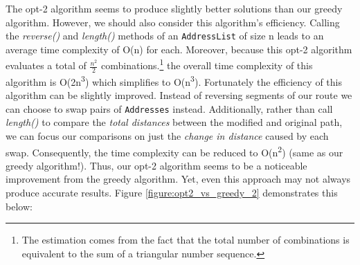 \documentclass[letterpaper]{article}
\begin{document}
\begin{figure}[h]
\begin{minipage}{0.3\linewidth}
        \end{minipage}
    \end{figure}
    

    The opt-2 algorithm seems to produce slightly better solutions than our 
    greedy algorithm. However, we should also consider this algorithm's 
    efficiency. Calling the \emph{reverse()} and \emph{length()} methods of an 
    \verb|AddressList| of size n leads to an average time complexity of O(n)
    for each. Moreover, because this opt-2 algorithm evaluates a total of 
    \(\frac{n^2}{2}\) combinations.\footnote{The estimation comes from 
    the fact that the total number of combinations is equivalent to the 
    sum of a triangular number sequence.} the overall time complexity of 
    this algorithm is O(2n\textsuperscript3)  which simplifies to 
    O(n\textsuperscript3). Fortunately the efficiency of this algorithm 
    can be slightly improved. Instead of reversing segments of our route 
    we can choose to swap pairs of \verb|Addresses| instead.  Additionally, rather 
    than call \emph{length()} to compare the \emph{total distances} between the 
    modified and original path, we can focus our comparisons on just the 
    \emph{change in distance} caused by each swap.
    Consequently, the time complexity can be reduced to 
    O(n\textsuperscript2) (same as our greedy algorithm!). Thus, our opt-2 algorithm seems to be a noticeable 
    improvement from the greedy algorithm. Yet, even this 
    approach may not always produce accurate results. Figure \ref*{figure:opt2_vs_greedy_2} demonstrates this below:
    
\end{document}
